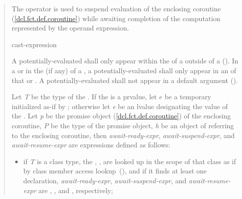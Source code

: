 \begin{quote}
\pnum
The  operator is used to suspend evaluation of the enclosing coroutine (\ref{dcl.fct.def.coroutine}) while awaiting completion of the computation represented by the operand expression.

\begin{bnf}
  \br
   cast-expression
\end{bnf}

\pnum
A potentially-evaluated 
 shall only appear within the  of a  outside of a  ().
%
In a  or in the  (if any) of a , a potentially-evaluated  shall only appear in an  of that  or .
%
%
A potentially-evaluated  shall not appear in a default argument ().

\pnum
Let \textit{T} be the type of the .
If the  is a prvalue, let $e$ be a temporary initialized as-if by ; otherwise let \textit{e} be an lvalue designating the value of the .
Let \textit{p} be the promise object (\ref{dcl.fct.def.coroutine})
of the enclosing coroutine, \textit{P} be the type of the promise object, \textit{h} be an object of  referring to the enclosing coroutine, then \textit{await-ready-expr}, \textit{await-suspend-expr}, and \textit{await-resume-expr} are expressions defined as follows:
\begin{itemize}
  \item if \textit{T}  is a class type, the 
  , , 
    are 
  looked up in the scope of that class
  as if by class member access lookup~(), and if it finds at least one declaration, 
  \textit{await-ready-expr}, \textit{await-suspend-expr}, and \textit{await-resume-expr} are
  , , and ,
  respectively;
  

\end{itemize}
\end{quote}
